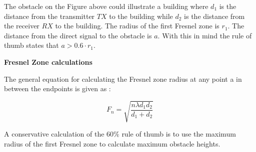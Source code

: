 The obstacle on the Figure above could illustrate a building where $d_{1}$ is the distance from the transmitter $TX$ to the building while $d_{2}$ is the distance from the receiver $RX$ to the building. The radius of the first Fresnel zone is $r_1$. The distance from the direct signal to the obstacle is $a$. 
With this in mind the rule of thumb states that $a > 0.6\cdot r_1$. 







\textbf{Fresnel Zone calculations}

The general equation for calculating the Fresnel zone radius at any point a in between the endpoints is given as \citep{introRF}:

\begin{equation}
F_{n} = \sqrt{\frac{n \lambda d_{1} d_{2}}{d_{1}+d_{2}}}
\label{fres:eq1}
\end{equation}

\begin{where}
\end{where}

A conservative calculation of the $60\%$ rule of thumb is to use the maximum radius of the first Fresnel zone to calculate maximum obstacle heights. %


